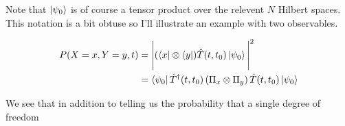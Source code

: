 \documentclass[12pt]{article}
\begin{document}
Note that $\ket{\psi_0}$ is of course a tensor product over the relevent $N$ Hilbert spaces. This notation is a bit obtuse so I'll illustrate an example with two observables.

\begin{align}
P(X=x, Y=y,t) &= \Bigg|(\bra{x}\otimes\bra{y}) \hat{T}(t,t_0)\ket{\psi_0} \Bigg|^2\\
&= \Bra{\psi_0}\hat{T}^{\dag}(t,t_0)\left(\Pi_x \otimes \Pi_y \right) \hat{T}(t,t_0)\ket{\psi_0}
\end{align}

We see that in addition to telling us the probability that a single degree of freedom
\end{document}
